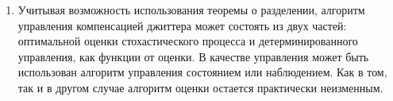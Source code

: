 \begin{enumerate}

 \item Учитывая возможность использования теоремы о разделении, алгоритм управления компенсацией джиттера может состоять из двух частей: оптимальной оценки стохастического процесса и детерминированного управления, как функции от оценки.
 В качестве управления может быть использован алгоритм управления состоянием или наблюдением.
 Как в том, так и в другом случае алгоритм оценки остается практически неизменным.
 \end{enumerate}



